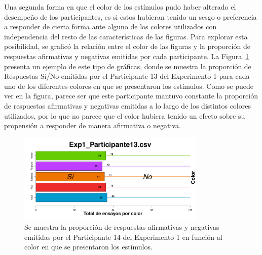 \begin{itemize}
Una segunda forma en que el color de los estímulos pudo haber alterado el desempeño de los participantes, es si estos hubieran tenido un sesgo o preferencia a responder de cierta forma ante alguno de los colores utilizados con independencia del resto de las características de las figuras. Para explorar esta posibilidad, se graficó la relación entre el color de las figuras y la proporción de respuestas afirmativas y negativas emitidas por cada participante. La Figura~\ref{fig:BiasCol_E1_P13} presenta un ejemplo de este tipo de gráficas, donde se muestra la proporción de Respuestas Sí/No emitidas por el Participante 13 del Experimento 1 para cada uno de los diferentes colores en que se presentaron los estímulos. Como se puede ver en la figura, parece ser que este participante mantuvo constante la proporción de respuestas afirmativas y negativas emitidas a lo largo de los distintos colores utilizados, por lo que no parece que el color hubiera tenido un efecto sobre su propensión a responder de manera afirmativa o negativa.\\

\begin{figure}[th]
\centering
\includegraphics[width=0.80\textwidth]{Figures/BiasColor_Exp1_P13}
\caption[Proporción de Respuestas Sí/No por color; Ejemplo]{Se muestra la proporción de respuestas afirmativas y negativas emitidas por el Participante 14 del Experimento 1 en función al color en que se presentaron los estímulos.}
\label{fig:BiasCol_E1_P13}
\end{figure}
\end{itemize}


